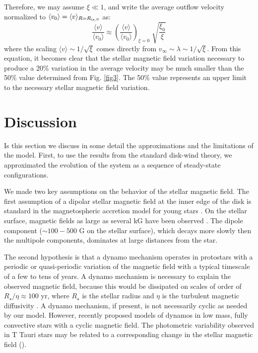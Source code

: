 \documentclass{emulateapj}
\begin{document}
Therefore, we may assume $\xi \ll 1$, and write the average outflow 
velocity normalized to $\langle v_0 \rangle = \langle v \rangle_{R=R_{\rm in,0}}$ as:
%
\begin{equation}
 \frac{\langle v \rangle }{\langle v_0 \rangle} \approx 
         \left(\frac{\langle v \rangle}{\langle v_0 \rangle}\right)_{\xi=0} \;
 \sqrt{\frac{\xi_0}{\xi}}
 \label{eq:vv0}
\end{equation}
%
where the scaling $\langle v \rangle \sim 1/\sqrt{\xi}$ 
comes directly from $v_{\infty} \sim \lambda \sim 1/\sqrt{\xi}$.
From this equation, it becomes clear that
the stellar magnetic field variation necessary to produce 
a 20\% variation in the average velocity
may be much smaller than the 50\% value determined from Fig. \ref{fig3}.
The 50\% value represents an upper limit
to the necessary stellar magnetic field variation.


\section{Discussion}
\label{discussion}

Is this section we discuss in some detail the approximations and 
the limitations of the model.
First, to use the
results from the standard disk-wind theory,
we approximated the evolution of the
system as a sequence of steady-state configurations.

We made two key assumptions 
on the behavior of the stellar magnetic field.
The first assumption of a dipolar stellar magnetic field
at the inner edge of the disk is standard in the
magnetospheric accretion model for young stars \citep{kon91}.
On the stellar surface, magnetic fields as large as several
kG have been observed \citep[e.g.][]{joh07}. The dipole
component ($\sim 100-500$ G on the stellar surface), which decays more slowly 
then the multipole components, dominates at large distances
from the star.

The second hypothesis is that 
a dynamo mechanism operates in protostars \citep{cha06,dob06}
 with a periodic or quasi-periodic variation of the magnetic field with a 
typical timescale of a few to tens of years.
A dynamo mechanism is necessary to explain the observed magnetic field,
because this would be dissipated on scales of order
of $R_\star/\eta \approx 100$ yr, where $R_\star$ is the stellar radius
and $\eta$ is the turbulent magnetic diffusivity \citep[e.g.][]{cha06}.
A dynamo mechanism, if present, is not necessarily cyclic
as needed by our model.
However, recently \citet{sok08} 
proposed models of dynamos in low mass, fully convective stars 
with a cyclic magnetic field.
The photometric variability observed in T Tauri stars 
\citep[e.g.][]{mel05,gra07} may be related to a corresponding
change in the stellar magnetic field (\citealt{arm95}).
\end{document}
